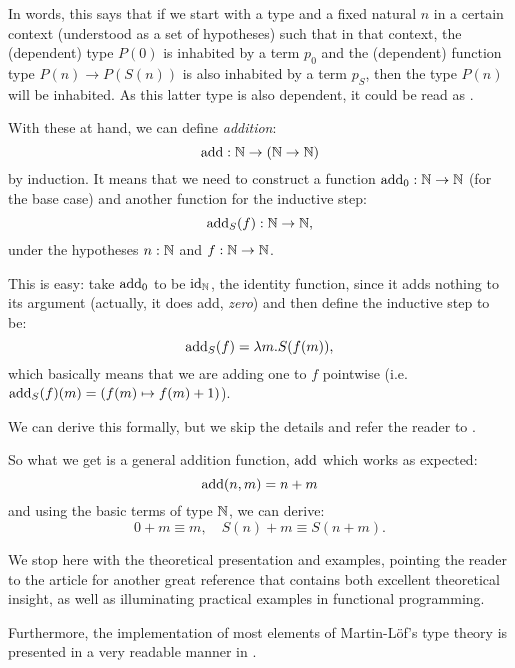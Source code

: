 In words, this says that if we start with a type and a fixed natural $ n $
in a certain context (understood as a set of hypotheses) such that
in that context, the (dependent) type $ P(0) $ is inhabited by
a term $ p_0 $ and the (dependent) function type $ P(n) \to P(S(n)) $
is also inhabited by a term $ p_S $, then the type $ P(n) $ will
be inhabited. As this latter type is also dependent, it could be
read as .

With these at hand, we can define \emph{addition}:
\[
  \mathrm{add} : \mathbb{N} \to (\mathbb{N} \to \mathbb{N})
\]
by induction. It means that we need to construct a function
$ \mathrm{add}_0 : \mathbb{N} \to \mathbb{N} $ (for the base case) and another
function for the inductive step:
\[
  \mathrm{add}_S(f) : \mathbb{N} \to \mathbb{N},
\]
under the hypotheses $ n : \mathbb{N} $ and $ f : \mathbb{N} \to \mathbb{N} $.

This is easy: take $ \mathrm{add}_0 $ to be $ \mathrm{id}_{\mathbb{N}} $,
the identity function, since it adds nothing to its argument
(actually, it does add, \emph{zero}) and then define the
inductive step to be:
\[
  \mathrm{add}_S(f) = \lambda m . S(f(m)),
\]
which basically means that we are adding one to $ f $ pointwise
(i.e.\ $ \mathrm{add}_S(f)(m) = (f(m) \mapsto f(m) + 1) $).

We can derive this formally, but we skip the details and refer the reader
to \cite[pp.\ 12-13]{rijke}.

So what we get is a general addition function, $ \mathrm{add} $ which works
as expected:
\[
  \mathrm{add}(n, m) = n + m
\]
and using the basic terms of type $ \mathbb{N} $, we can derive:
\[
  0 + m \equiv m, \quad S(n) + m \equiv S(n + m).
\]

\vspace{0.3cm}

We stop here with the theoretical presentation and examples, pointing
the reader to the article \cite{mcbride} for another great reference that
contains both excellent theoretical insight, as well as illuminating
practical examples in functional programming.

Furthermore, the implementation of most elements of Martin-L\"{o}f's type
theory is presented in a very readable manner in \cite{pmltt}.

